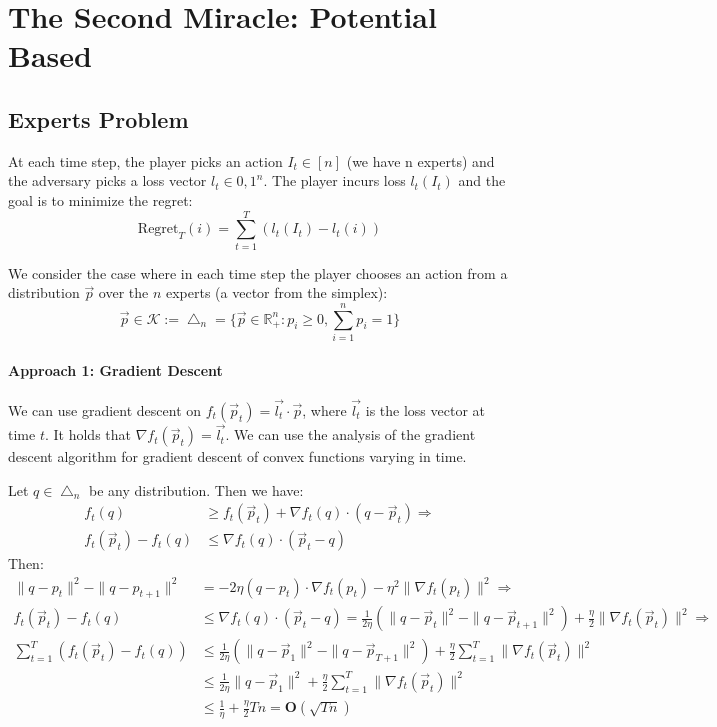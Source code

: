 \documentclass[11pt]{book} %
\begin{document}
\chapter{The Second Miracle: Potential Based}

\section{Experts Problem}

At each time step, the player picks an action $I_t \in [n]$ (we have n experts) and the adversary picks a loss vector $l_t \in {0,1}^n$. 
The player incurs loss $l_t(I_t)$ and the goal is to minimize the regret:
\begin{equation}
    \text{Regret}_T(i) = \sum_{t=1}^T \left( l_t(I_t) - l_t(i) \right)
\end{equation}

We consider the case where in each time step the player chooses an action from a distribution $\vec{p}$ over the $n$ experts (a vector from the simplex):
\begin{equation*}
    \vec{p} \in \mathcal{K} := \bigtriangleup_n = \{ \vec{p} \in \mathbb{R}_+^n : p_i \geq 0, \sum_{i=1}^n p_i = 1 \}
\end{equation*}

\subsubsection{Approach 1: Gradient Descent}
We can use gradient descent on $f_t(\vec{p}_t) = \vec{l_t} \cdot \vec{p}$, where $\vec{l_t}$ is the loss vector at time $t$.
It holds that $\nabla f_t(\vec{p}_t) = \vec{l_t}$. We can use the analysis of the gradient descent algorithm for gradient descent of convex functions varying in time.

Let $q \in \bigtriangleup_n$ be any distribution. Then we have:
\begin{align*}
    f_t(q) &\geq f_t(\vec{p}_t) + \nabla f_t(q) \cdot (q - \vec{p}_t) \Longrightarrow \\
    f_t(\vec{p}_t) - f_t(q) &\leq \nabla f_t(q) \cdot (\vec{p}_t - q) 
\end{align*}
Then:
\begin{align*}
    \| q - p_t \|^2 - \| q - p_{t+1} \|^2 &= - 2 \eta (q - p_t) \cdot \nabla f_t(p_t) - \eta^2 \| \nabla f_t(p_t) \|^2  \Longrightarrow \\
    f_t(\vec{p}_t) - f_t(q) &\leq \nabla f_t(q) \cdot (\vec{p}_t - q)  = \frac{1}{2\eta} \left( \| q - \vec{p}_t \|^2  - \| q - \vec{p}_{t+1} \|^2 \right) + \frac{\eta}{2} \| \nabla f_t(\vec{p}_t) \|^2 \Longrightarrow \\ 
    \sum_{t=1}^T \left( f_t(\vec{p}_t) - f_t(q) \right) &\leq \frac{1}{2\eta} \left( \| q - \vec{p}_1 \|^2 - \| q - \vec{p}_{T+1} \|^2 \right)+ \frac{\eta}{2} \sum_{t=1}^T \| \nabla f_t(\vec{p}_t) \|^2 \\
    &\leq \frac{1}{2\eta} \| q - \vec{p}_1 \|^2 + \frac{\eta}{2} \sum_{t=1}^T \| \nabla f_t(\vec{p}_t) \|^2 \\
    &\leq \frac{1}{\eta} + \frac{\eta}{2} T n  = \textbf{O} ( \sqrt{Tn} )
\end{align*}
\end{document}
